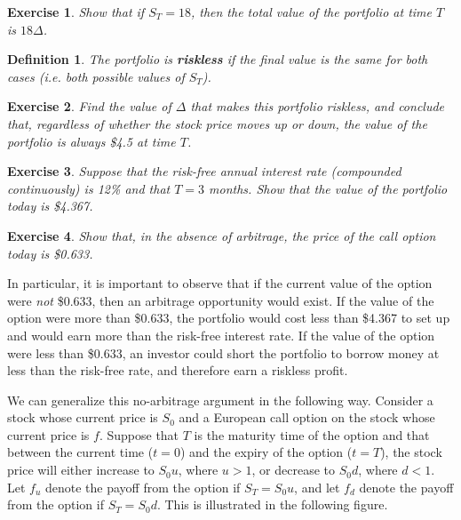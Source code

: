 \documentclass[letterpaper,10pt]{article}
\newtheorem{df}{Definition}[section]
\newtheorem{ex}{Exercise}
\begin{document}
\begin{ex}
Show that if $S_T=18$, then the total value of the portfolio at time $T$ is $18\Delta$.
\end{ex}

\begin{df} The portfolio is {\bf riskless} if the final value is the same for both cases (i.e. both possible values of $S_T$).
\end{df}  

\begin{ex}
Find the value of $\Delta$ that makes this portfolio riskless, and conclude that, regardless of whether the stock price moves up or down, the value of the portfolio is always \$4.5 at time $T$.
\end{ex}



\begin{ex}
Suppose that the risk-free annual interest rate (compounded continuously) is 12\% and that $T=3$ months.  Show that the value of the portfolio today is \$4.367. 
\end{ex}

\begin{ex}
Show that, in the absence of arbitrage, the price of the call option today is \$0.633.
\end{ex}

\noindent In particular, it is important to observe that if the current value of the option were {\em not} \$0.633, then an arbitrage opportunity would exist.  If the value of the option were more than \$0.633, the portfolio would cost less than \$4.367 to set up and would earn more than the risk-free interest rate.  If the value of the option were less than \$0.633, an investor could short the portfolio to borrow money at less than the risk-free rate, and therefore earn a riskless profit.

\smallskip

We can generalize this no-arbitrage argument in the following way.  Consider a stock whose current price is $S_0$ and a European call option on the stock whose current price is $f$.  Suppose that $T$ is the maturity time of the option and that between the current time ($t=0$) and the expiry of the option ($t=T$), the stock price will either increase to $S_0u$, where $u>1$, or decrease to $S_0d$, where $d<1$.  Let $f_u$ denote the payoff from the option if $S_T=S_0u$, and let $f_d$ denote the payoff from the option if $S_T=S_0d$.  This is illustrated in the following figure.
\end{document}
